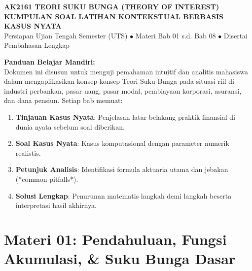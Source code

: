 \documentclass[11pt,a4paper]{article}
\begin{document}
\begin{tcolorbox}[
    enhanced,
    colback=primaryblue,
    colframe=primaryblue,
    arc=2mm,
    left=4mm,right=4mm,top=3.5mm,bottom=3.5mm,
    boxrule=0pt
]
\begin{center}
    {\fontsize{15}{18}\selectfont\bfseries\color{white} AK2161 TEORI SUKU BUNGA (THEORY OF INTEREST)}\\[1.5mm]
    {\fontsize{12}{15}\selectfont\bfseries\color{amberbg} KUMPULAN SOAL LATIHAN KONTEKSTUAL BERBASIS KASUS NYATA}\\[1mm]
    {\fontsize{9.5}{12}\selectfont\color{white} Persiapan Ujian Tengah Semester (UTS) $\bullet$ Materi Bab 01 s.d. Bab 08 $\bullet$ Disertai Pembahasan Lengkap}
\end{center}
\end{tcolorbox}

\vspace{2mm}

\begin{tcolorbox}[
    enhanced,
    colback=boxbg,
    colframe=secondaryblue,
    arc=1.5mm,
    boxrule=0.6pt,
    left=3mm,right=3mm,top=2mm,bottom=2mm
]
\small
\textbf{Panduan Belajar Mandiri:}\\[1mm]
Dokumen ini disusun untuk menguji pemahaman intuitif dan analitis mahasiswa dalam mengaplikasikan konsep-konsep Teori Suku Bunga pada situasi riil di industri perbankan, pasar uang, pasar modal, pembiayaan korporasi, asuransi, dan dana pensiun. Setiap bab memuat:
\begin{enumerate}[leftmargin=5mm, topsep=1pt, itemsep=1pt]
    \item \textbf{Tinjauan Kasus Nyata}: Penjelasan latar belakang praktik finansial di dunia nyata sebelum soal diberikan.
    \item \textbf{Soal Kasus Nyata}: Kasus komputasional dengan parameter numerik realistis.
    \item \textbf{Petunjuk Analisis}: Identifikasi formula aktuaria utama dan jebakan (*common pitfalls*).
    \item \textbf{Solusi Lengkap}: Penurunan matematis langkah demi langkah beserta interpretasi hasil akhirnya.
\end{enumerate}
\end{tcolorbox}

\vspace{1mm}

\section*{Materi 01: Pendahuluan, Fungsi Akumulasi, \& Suku Bunga Dasar}
\end{document}
